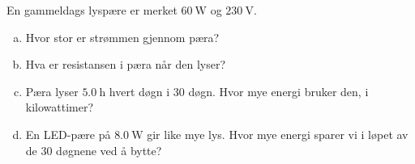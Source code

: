 %
En gammeldags lyspære er merket $\SI{60}{\watt}$ og $\SI{230}{\volt}$.
\begin{enumerate}[a)]
    \item Hvor stor er strømmen gjennom pæra?
    \item Hva er resistansen i pæra når den lyser?
    \item Pæra lyser $\SI{5.0}{\hour}$ hvert døgn i 30 døgn. Hvor mye energi bruker den, i kilowattimer?
    \item En LED-pære på $\SI{8.0}{\watt}$ gir like mye lys. Hvor mye energi sparer vi i løpet av de 30 døgnene ved å bytte?
\end{enumerate}
%
